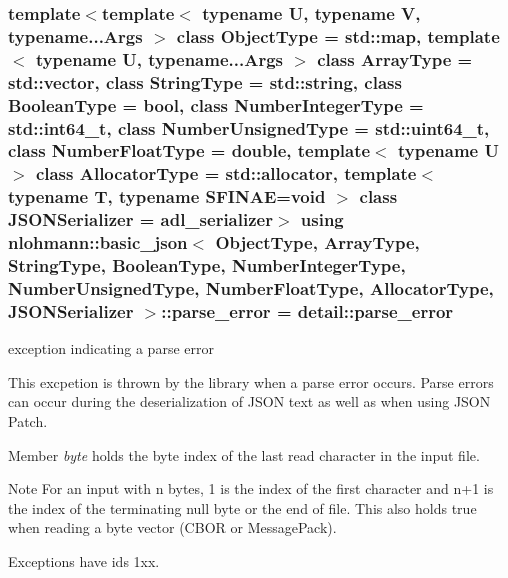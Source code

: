 \subsubsection[{\texorpdfstring{parse\+\_\+error}{parse_error}}]{\setlength{\rightskip}{0pt plus 5cm}template$<$template$<$ typename U, typename V, typename...\+Args $>$ class Object\+Type = std\+::map, template$<$ typename U, typename...\+Args $>$ class Array\+Type = std\+::vector, class String\+Type  = std\+::string, class Boolean\+Type  = bool, class Number\+Integer\+Type  = std\+::int64\+\_\+t, class Number\+Unsigned\+Type  = std\+::uint64\+\_\+t, class Number\+Float\+Type  = double, template$<$ typename U $>$ class Allocator\+Type = std\+::allocator, template$<$ typename T, typename S\+F\+I\+N\+A\+E=void $>$ class J\+S\+O\+N\+Serializer = adl\+\_\+serializer$>$ using {\bf nlohmann\+::basic\+\_\+json}$<$ Object\+Type, Array\+Type, String\+Type, Boolean\+Type, Number\+Integer\+Type, Number\+Unsigned\+Type, Number\+Float\+Type, Allocator\+Type, J\+S\+O\+N\+Serializer $>$\+::{\bf parse\+\_\+error} =  {\bf detail\+::parse\+\_\+error}}\hypertarget{classnlohmann_1_1basic__json_af1efc2468e6022be6e35fc2944cabe4d}{}\label{classnlohmann_1_1basic__json_af1efc2468e6022be6e35fc2944cabe4d}


exception indicating a parse error 

This excpetion is thrown by the library when a parse error occurs. Parse errors can occur during the deserialization of J\+S\+ON text as well as when using J\+S\+ON Patch.

Member {\itshape byte} holds the byte index of the last read character in the input file.

\begin{DoxyNote}{Note}
For an input with n bytes, 1 is the index of the first character and n+1 is the index of the terminating null byte or the end of file. This also holds true when reading a byte vector (C\+B\+OR or Message\+Pack).
\end{DoxyNote}
Exceptions have ids 1xx.

